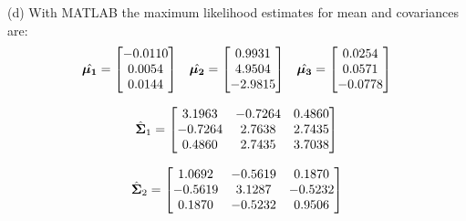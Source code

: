 \documentclass[12pt]{article}
\begin{document}
\noindent(d) With MATLAB the maximum likelihood estimates for mean and covariances are:
\begin{equation*}
\begin{aligned}
\centering {\begin{matrix}
\hat{\bm{\mu_1}} = \begin{bmatrix}
  -0.0110 \\ 
  0.0054 \\ 
  0.0144 \\ 
\end{bmatrix} &  \hat{\bm{\mu_2}} = \begin{bmatrix}
 0.9931 \\
 4.9504 \\
 -2.9815
\end{bmatrix} & \hat{\bm{\mu_3}} = \begin{bmatrix}
 0.0254 \\
 0.0571 \\
 -0.0778
\end{bmatrix}
\end{matrix}}
\end{aligned}
\end{equation*}

\begin{equation*}
\begin{aligned}
\centering {\begin{matrix}
\hat{\bm{\Sigma}}_1 = \begin{bmatrix}
    3.1963  & -0.7264  &  0.4860 \\
   -0.7264  &  2.7638  &  2.7435 \\
    0.4860  &  2.7435  &  3.7038
\end{bmatrix}
\end{matrix}}
\end{aligned}
\end{equation*}

\begin{equation*}
\begin{aligned}
\centering {\begin{matrix}
\hat{\bm{\Sigma}}_2  = \begin{bmatrix}
    1.0692  & -0.5619  &  0.1870  \\
   -0.5619  &  3.1287  & -0.5232  \\
    0.1870  & -0.5232  &  0.9506
\end{bmatrix}
\end{matrix}}
\end{aligned}
\end{equation*}
\end{document}

